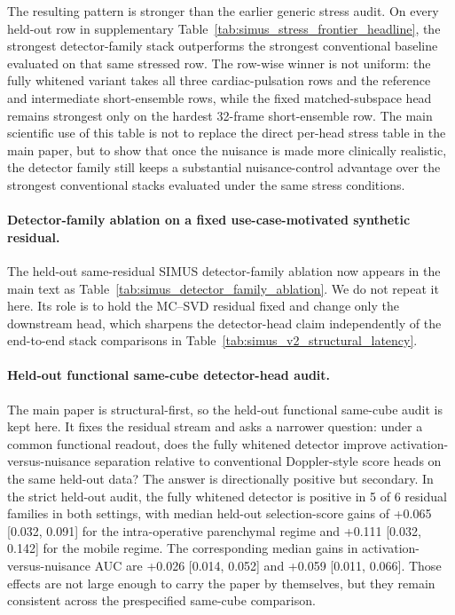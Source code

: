 The resulting pattern is stronger than the earlier generic stress audit. On every held-out row in supplementary Table~\ref{tab:simus_stress_frontier_headline}, the strongest detector-family stack outperforms the strongest conventional baseline evaluated on that same stressed row. The row-wise winner is not uniform: the fully whitened variant takes all three cardiac-pulsation rows and the reference and intermediate short-ensemble rows, while the fixed matched-subspace head remains strongest only on the hardest 32-frame short-ensemble row. The main scientific use of this table is not to replace the direct per-head stress table in the main paper, but to show that once the nuisance is made more clinically realistic, the detector family still keeps a substantial nuisance-control advantage over the strongest conventional stacks evaluated under the same stress conditions.

\paragraph{Detector-family ablation on a fixed use-case-motivated synthetic residual.}
The held-out same-residual SIMUS detector-family ablation now appears in the main text as Table~\ref{tab:simus_detector_family_ablation}. We do not repeat it here. Its role is to hold the MC--SVD residual fixed and change only the downstream head, which sharpens the detector-head claim independently of the end-to-end stack comparisons in Table~\ref{tab:simus_v2_structural_latency}.

\paragraph{Held-out functional same-cube detector-head audit.}
The main paper is structural-first, so the held-out functional same-cube audit is kept here. It fixes the residual stream and asks a narrower question: under a common functional readout, does the fully whitened detector improve activation-versus-nuisance separation relative to conventional Doppler-style score heads on the same held-out data? The answer is directionally positive but secondary. In the strict held-out audit, the fully whitened detector is positive in 5 of 6 residual families in both settings, with median held-out selection-score gains of +0.065 [0.032, 0.091] for the intra-operative parenchymal regime and +0.111 [0.032, 0.142] for the mobile regime. The corresponding median gains in activation-versus-nuisance AUC are +0.026 [0.014, 0.052] and +0.059 [0.011, 0.066]. Those effects are not large enough to carry the paper by themselves, but they remain consistent across the prespecified same-cube comparison.

